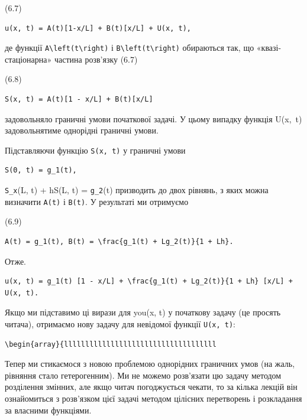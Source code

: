 \documentclass[
  ukrainian,
]{article}
\begin{document}
(6.7)

\begin{verbatim}
u(x, t) = A(t)[1-x/L] + B(t)[x/L] + U(x, t),
\end{verbatim}

де функції \texttt{A\textbackslash{}left(t\textbackslash{}right)} і
\texttt{B\textbackslash{}left(t\textbackslash{}right)} обираються так,
що «квазі-стаціонарна» частина розв'язку (6.7)

(6.8)

\begin{verbatim}
S(x, t) = A(t)[1 - x/L] + B(t)[x/L]
\end{verbatim}

задовольняло граничні умови початкової задачі. У цьому випадку функція
U\left(x,~t\right) задовольнятиме однорідні граничні умови.

Підставляючи функцію \texttt{S(x,\ t)} у граничні умови

\begin{verbatim}
S(0, t) = g_1(t),
\end{verbatim}

\texttt{S\_x}(L, t) + hS(L, t) = \texttt{g\_2}(t) призводить до двох
рівнянь, з яких можна визначити \texttt{A(t)} і \texttt{B(t)}. У
результаті ми отримуємо

(6.9)

\begin{verbatim}
A(t) = g_1(t), B(t) = \frac{g_1(t) + Lg_2(t)}{1 + Lh}.
\end{verbatim}

Отже.

\begin{verbatim}
u(x, t) = g_1(t) [1 - x/L] + \frac{g_1(t) + Lg_2(t)}{1 + Lh} [x/L] + U(x, t).
\end{verbatim}

Якщо ми підставимо ці вирази для you(x, t) у початкову задачу (це
просять читача), отримаємо нову задачу для невідомої функції
\texttt{U(x,\ t)}:

\begin{verbatim}
\begin{array}{llllllllllllllllllllllllllllllllllll
\end{verbatim}

Тепер ми стикаємося з новою проблемою однорідних граничних умов (на
жаль, рівняння стало гетерогенним). Ми не можемо розв'язати цю задачу
методом розділення змінних, але якщо читач погоджується чекати, то за
кілька лекцій він ознайомиться з розв'язком цієї задачі методом цілісних
перетворень і розкладання за власними функціями.
\end{document}
